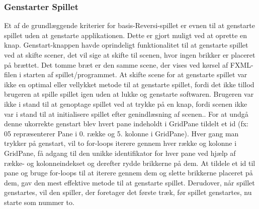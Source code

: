 \subsubsection{Genstarter Spillet} \label{gs}

Et af de grundlæggende kriterier for basis-Reversi-spillet er evnen til at genstarte spillet uden at genstarte applikationen. Dette er gjort muligt ved at oprette en knap. Genstart-knappen havde oprindeligt funktionalitet til at genstarte spillet ved at skifte scener, det vil sige at skifte til scenen, hvor ingen brikker er placeret på brættet. Det tomme bræt er den samme scene, der vises ved kørsel af FXML-filen i starten af spillet/programmet. At skifte scene for at genstarte spillet var ikke en optimal eller vellykket metode til at genstarte spillet, fordi det ikke tillod brugeren at spille spillet igen uden at lukke og genstarte softwaren. Brugeren var ikke i stand til at genoptage spillet ved at trykke på en knap, fordi scenen ikke var i stand til at initialisere spillet efter genindlæsning af scenen.. \newline
\newline
For at undgå denne ukorrekte genstart blev hvert pane indeholdt i GridPane tildelt et id (fx: 05 repræsenterer Pane i 0. række og 5. kolonne i GridPane). Hver gang man trykker på genstart, vil to for-loops iterere gennem hver række og kolonne i GridPane, få adgang til den unikke identifikator for hver pane ved hjælp af række- og kolonneindekset og derefter rydde brikkerne på dem. At tildele et id til pane og bruge for-loops til at iterere gennem dem og slette brikkerne placeret på dem, gav den mest effektive metode til at genstarte spillet. Derudover, når spillet genstartes, vil den spiller, der foretager det første træk, før spillet genstartes, nu starte som nummer to.
